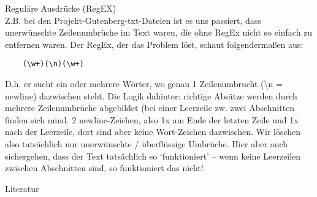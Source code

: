 \begin{frame}{Reguläre Ausdrücke (RegEX)}
\\
Z.B. bei den Projekt-Gutenberg-txt-Dateien ist es uns passiert, dass unerwünschte Zeilenumbrüche im Text waren, die ohne RegEx nicht so einfach zu entfernen waren. Der RegEx, der das Problem löst, schaut folgendermaßen aus:
\begin{verbatim}
    (\w+)(\n)(\w+)
\end{verbatim}
D.h. er sucht ein oder mehrere Wörter, wo genau 1 Zeilenumbrucht (\textbackslash n = newline) dazwischen steht. Die Logik dahinter: richtige Absätze werden durch mehrere Zeilenumbrüche abgebildet (bei einer Leerzeile zw. zwei Abschnitten finden sich mind. 2 newline-Zeichen, also 1x am Ende der letzten Zeile und 1x nach der Leerzeile, dort sind aber keine Wort-Zeichen dazwischen. Wir löschen also tatsächlich nur unerwünschte / überflüssige  Umbrüche. Hier aber auch sichergehen, dass der Text tatsächlich so `funktioniert' -- wenn keine Leerzeilen zwischen Abschnitten sind, so funktioniert das nicht!

\end{frame}



\begin{frame}[allowframebreaks]{Literatur}

\AtNextBibliography{\footnotesize}
\printbibliography  
\end{frame}
